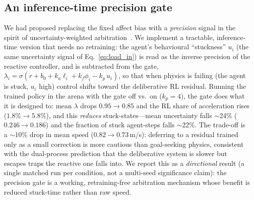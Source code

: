 \documentclass[sigconf,nonacm]{acmart}
\begin{document}
\subsection{An inference-time precision gate}
\label{sec:prec}
We had proposed replacing the fixed affect bias with a \emph{precision} signal in the spirit of
uncertainty-weighted arbitration~\cite{daw2005,lee2014}. We implement a tractable, inference-time
version that needs no retraining: the agent's behavioural ``stuckness'' $u_i$ (the same uncertainty
signal of Eq.~\eqref{eq:load_in}) is read as the inverse precision of the reactive controller, and is
subtracted from the gate, $\lambda_i = \sigma(r + b_0 + k_a\ell_i + k_f\phi_i - k_p\,u_i)$, so that
when physics is failing (the agent is stuck, $u_i$ high) control shifts toward the deliberative RL
residual. Running the trained policy in the arena with the gate off vs.\ on ($k_p=4$), the gate does
what it is designed to: mean $\lambda$ drops $0.95\!\to\!0.85$ and the RL share of acceleration rises
($1.8\%\!\to\!5.8\%$), and this \emph{reduces} stuck-states---mean uncertainty falls $\sim$24\%
($0.246\!\to\!0.186$) and the fraction of stuck agent-steps falls $\sim$22\%. The trade-off is a
$\sim$10\% drop in mean speed ($0.82\!\to\!0.73$\,m/s): deferring to a residual trained only as a
small correction is more cautious than goal-seeking physics, consistent with the dual-process
prediction that the deliberative system is slower but escapes traps the reactive one falls into. We
report this as a \emph{directional} result (a single matched run per condition, not a multi-seed
significance claim): the precision gate is a working, retraining-free arbitration mechanism whose
benefit is reduced stuck-time rather than raw speed.
\end{document}
